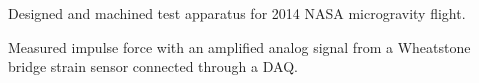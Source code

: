 \documentclass[]{deedy-resume-openfont}
\begin{document}
\begin{tightemize2}
\item Designed and machined test apparatus for 2014 NASA microgravity flight.
\item Measured impulse force with an amplified analog signal from a Wheatstone bridge strain sensor connected through a DAQ.
\end{tightemize2}
\sectionsep


\end{document}
